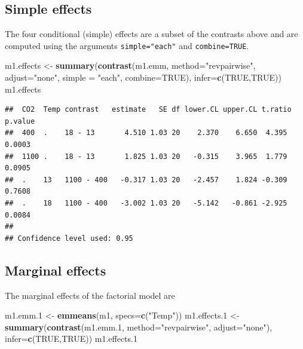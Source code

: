 \documentclass[]{book}
\newenvironment{Shaded}{\begin{snugshade}}{\end{snugshade}}
\newcommand{\DataTypeTok}[1]{\textcolor[rgb]{0.13,0.29,0.53}{#1}}
\newcommand{\FloatTok}[1]{\textcolor[rgb]{0.00,0.00,0.81}{#1}}
\newcommand{\KeywordTok}[1]{\textcolor[rgb]{0.13,0.29,0.53}{\textbf{#1}}}
\newcommand{\NormalTok}[1]{#1}
\newcommand{\OtherTok}[1]{\textcolor[rgb]{0.56,0.35,0.01}{#1}}
\newcommand{\StringTok}[1]{\textcolor[rgb]{0.31,0.60,0.02}{#1}}
\begin{document}
\hypertarget{simple-effects}{%
\subsection{Simple effects}\label{simple-effects}}

The four conditional (simple) effects are a subset of the contrasts above and are computed using the arguments \texttt{simple="each"} and \texttt{combine=TRUE}.

\begin{Shaded}
\begin{Highlighting}[]
\NormalTok{m1.effects <-}\StringTok{ }\KeywordTok{summary}\NormalTok{(}\KeywordTok{contrast}\NormalTok{(m1.emm,}
                 \DataTypeTok{method=}\StringTok{"revpairwise"}\NormalTok{,}
                 \DataTypeTok{adjust=}\StringTok{"none"}\NormalTok{,}
                 \DataTypeTok{simple =} \StringTok{"each"}\NormalTok{,}
                 \DataTypeTok{combine=}\OtherTok{TRUE}\NormalTok{),}
        \DataTypeTok{infer=}\KeywordTok{c}\NormalTok{(}\OtherTok{TRUE}\NormalTok{,}\OtherTok{TRUE}\NormalTok{))}
\NormalTok{m1.effects}
\end{Highlighting}
\end{Shaded}

\begin{verbatim}
##  CO2  Temp contrast   estimate   SE df lower.CL upper.CL t.ratio p.value
##  400  .    18 - 13       4.510 1.03 20    2.370    6.650  4.395  0.0003 
##  1100 .    18 - 13       1.825 1.03 20   -0.315    3.965  1.779  0.0905 
##  .    13   1100 - 400   -0.317 1.03 20   -2.457    1.824 -0.309  0.7608 
##  .    18   1100 - 400   -3.002 1.03 20   -5.142   -0.861 -2.925  0.0084 
## 
## Confidence level used: 0.95
\end{verbatim}

\hypertarget{marginal-effects-1}{%
\subsection{Marginal effects}\label{marginal-effects-1}}

The marginal effects of the factorial model are

\begin{Shaded}
\begin{Highlighting}[]
\NormalTok{m1.emm}\FloatTok{.1}\NormalTok{ <-}\StringTok{ }\KeywordTok{emmeans}\NormalTok{(m1, }\DataTypeTok{specs=}\KeywordTok{c}\NormalTok{(}\StringTok{"Temp"}\NormalTok{))}
\NormalTok{m1.effects}\FloatTok{.1}\NormalTok{ <-}\StringTok{ }\KeywordTok{summary}\NormalTok{(}\KeywordTok{contrast}\NormalTok{(m1.emm}\FloatTok{.1}\NormalTok{,}
                 \DataTypeTok{method=}\StringTok{"revpairwise"}\NormalTok{,}
                 \DataTypeTok{adjust=}\StringTok{"none"}\NormalTok{),}
        \DataTypeTok{infer=}\KeywordTok{c}\NormalTok{(}\OtherTok{TRUE}\NormalTok{,}\OtherTok{TRUE}\NormalTok{))}
\NormalTok{m1.effects}\FloatTok{.1}
\end{Highlighting}
\end{Shaded}
\end{document}
